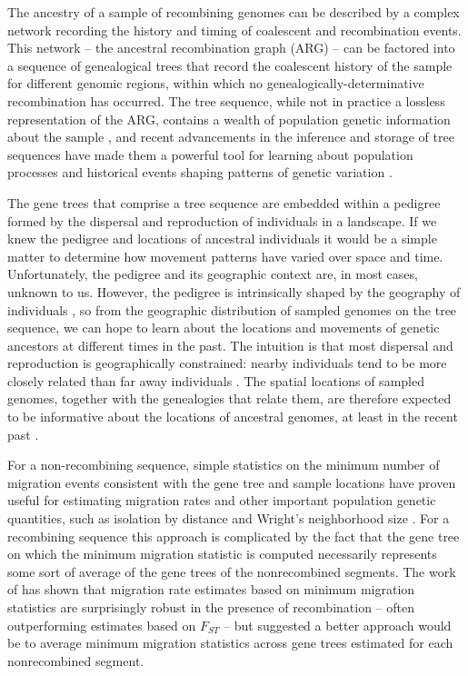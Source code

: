 The ancestry of a sample of recombining genomes can be described by a complex
network recording the history and timing of coalescent and recombination
events. This network -- the ancestral recombination graph (ARG) -- can be
factored into a sequence of genealogical trees that record the coalescent 
history of the sample for different genomic regions, within which no 
genealogically-determinative recombination has occurred. The tree sequence, 
while not in practice a lossless representation of the ARG, contains a wealth 
of population genetic information about the sample \citep{Ralph_etal_2020}, and
recent advancements in the inference and storage of tree sequences have made 
them a powerful tool for learning about population processes and historical 
events shaping patterns of genetic variation
\citep{Anderson-Trocme_etal_2023, Kelleher_etal_2016, Kelleher_etal_2019}.

The gene trees that comprise a tree sequence are embedded within a pedigree
formed by the dispersal and reproduction of individuals in a landscape. If we 
knew the pedigree and locations of ancestral individuals it would be a simple 
matter to determine how movement patterns have varied over space and time. 
Unfortunately, the pedigree and its geographic context are, in most cases, 
unknown to us. However, the pedigree is intrinsically shaped by the geography 
of individuals \citep{Bradburd_Ralph_2019},
so from the geographic distribution of sampled genomes on the tree
sequence, we can hope to learn about the locations and movements of 
genetic ancestors at different times in the past. The intuition is that most
dispersal and reproduction is geographically constrained: nearby individuals 
tend to be more closely related than far away individuals \citep{Wright_1943}.  
The spatial locations of sampled genomes, together with the genealogies that 
relate them, are therefore expected to be informative about the locations of 
ancestral genomes, at least in the recent past \citep{Wakeley_1999, Wilkins_2004}.

For a non-recombining sequence, simple statistics on the minimum number of
migration events consistent with the gene tree and sample locations have
proven useful for estimating migration rates and other important population
genetic quantities, such as isolation by distance and Wright's neighborhood
size \citep{Slatkin_Maddison_1989, Slatkin_Maddison_1990}. For a recombining
sequence this approach is complicated by the fact that the gene tree on which
the minimum migration statistic is computed necessarily represents some sort of
average of the gene trees of the nonrecombined segments. The work of 
\citet{Hudson_etal_1992} has shown that migration rate estimates based on
minimum migration statistics are surprisingly robust in the presence of
recombination -- often outperforming estimates based on $F_{ST}$ -- but 
suggested a better approach would be to average minimum migration 
statistics across gene trees estimated for each nonrecombined segment.

